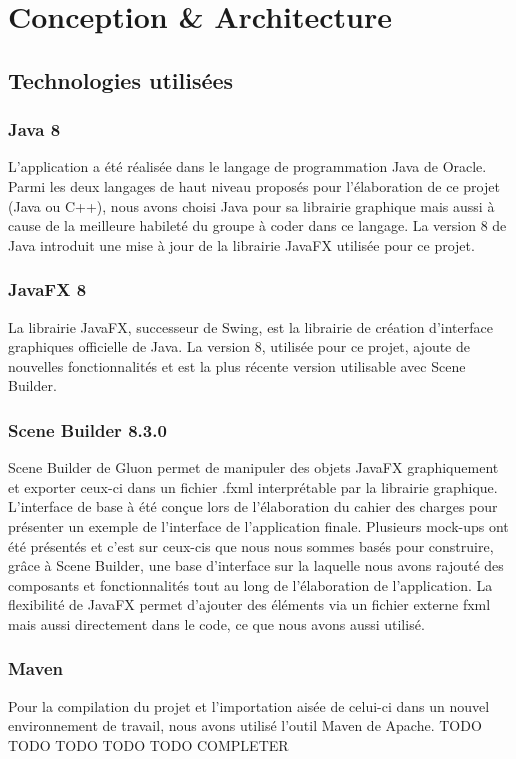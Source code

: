 \section{Conception \& Architecture}
\subsection{Technologies utilisées}
\subsubsection{Java 8}
L'application a été réalisée dans le langage de programmation Java de Oracle. Parmi les deux langages de haut niveau proposés pour l'élaboration de ce projet (Java ou C++), nous avons choisi Java pour sa librairie graphique mais aussi à cause de la meilleure habileté du groupe à coder dans ce langage. La version 8 de Java introduit une mise à jour de la librairie JavaFX utilisée pour ce projet.

\subsubsection{JavaFX 8}
La librairie JavaFX, successeur de Swing, est la librairie de création d'interface graphiques officielle de Java. La version 8, utilisée pour ce projet, ajoute de nouvelles fonctionnalités et est la plus récente version utilisable avec Scene Builder. 

\subsubsection{Scene Builder 8.3.0}
Scene Builder de Gluon permet de manipuler des objets JavaFX graphiquement et exporter ceux-ci dans un fichier .fxml interprétable par la librairie graphique. L'interface de base à été conçue lors de l'élaboration du cahier des charges pour présenter un exemple de l'interface de l'application finale. Plusieurs mock-ups ont été présentés et c'est sur ceux-cis que nous nous sommes basés pour construire, grâce à Scene Builder, une base d'interface sur la laquelle nous avons rajouté des composants et fonctionnalités tout au long de l'élaboration de l'application. La flexibilité de JavaFX permet d'ajouter des éléments via un fichier externe fxml mais aussi directement dans le code, ce que nous avons aussi utilisé.

\subsubsection{Maven}
Pour la compilation du projet et l'importation aisée de celui-ci dans un nouvel environnement de travail, nous avons utilisé l'outil Maven de Apache.
TODO TODO TODO TODO TODO COMPLETER

